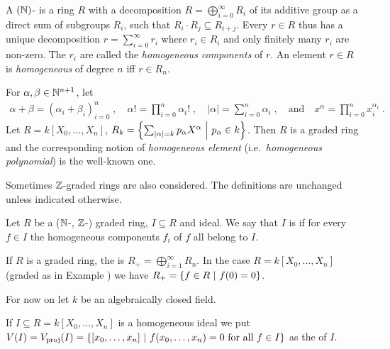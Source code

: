 \documentclass[a4paper,parskip=half,numbers=enddot, DIV=12]{scrreprt}
\begin{document}
\begin{defi}
    A $(\mathbb{N})$- is a ring $R$ with a decomposition $R = \bigoplus_{i=0}^\infty R_i$ of its additive group as a direct sum of subgroups $R_i$, such that $R_i\cdot R_j \subseteq R_{i+j}$. Every $r\in R$ thus has a unique decomposition $r=\sum_{i=0}^\infty r_i$ where $r_i\in R_i$ and only finitely many $r_i$ are non-zero.  The $r_i$ are called the \emph{homogeneous components} of $r$. An element $r\in R$ is \emph{homogeneous} of degree $n$ iff $r\in R_n$.
\end{defi}
\begin{example}
    For $\alpha, \beta\in \mathbb{N}^{n+1}$, let 
    \begin{align*}
        \alpha+\beta = (\alpha_i+\beta_i)_{i=0}^n\;,\quad
        \alpha! = \prod_{i=0}^n \alpha_i!\;,\quad
        |\alpha| = \sum_{i=0}^n \alpha_i\;,\quad\text{and}\quad
        x^\alpha = \prod_{i=0}^n x_i^{\alpha_i}\;. 
    \end{align*}
    Let $R=k[X_0,\ldots, X_n]$, $R_k = \left\{\sum_{|\alpha| = k} p_\alpha X^\alpha\ \middle|\  p_\alpha \in k\right\}$. Then $R$ is a graded ring and the corresponding notion of \emph{homogeneous element} (i.e.\ \emph{homogeneous polynomial}) is the well-known one.
\end{example}
\begin{rem*}
    Sometimes $\mathbb{Z}$-graded rings are also considered. The definitions are unchanged unless indicated otherwise.
\end{rem*}
\begin{defi}
    Let $R$ be a ($\mathbb{N}$-, $\mathbb{Z}$-) graded ring, $I\subseteq R$ and ideal. We say that $I$ is  if for every $f\in I$ the homogeneous components $f_i$ of $f$ all belong to $I$.
\end{defi}
\begin{example}
    If $R$ is a graded ring, the  is $R_+= \bigoplus_{i=1}^\infty R_n$. In the case $R=k[X_0, \ldots, X_n]$ (graded as in Example ) we have $R_+= \left\{f\in R\ \middle|\  f(0) = 0\right\}$.
\end{example}
For now on let $k$ be an algebraically closed field.
\def\proj{{\mathrm{proj}}}
\def\aff{{\mathrm{aff}}}
\begin{defi} 
    If $I\subseteq R= k[X_0,\ldots, X_n]$ is a homogeneous ideal we put $V(I) = V_\proj (I) = \left\{[x_0,\ldots, x_n]\st f(x_0,\ldots, x_n) = 0 \text{ for all } f\in I\right\}$ as the  of $I$.
\end{defi}
\end{document}
